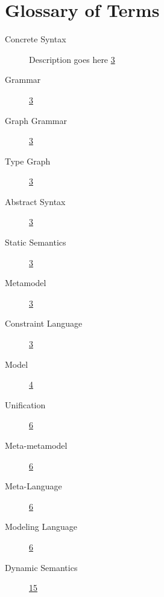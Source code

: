 \section{Glossary of Terms}

\begin{description}

\item[Concrete Syntax] Description goes here \hfill \hyperlink{page.3}{3}

\item[Grammar] \hfill \hyperlink{page.3}{3}

\item[Graph Grammar] \hfill \hyperlink{page.3}{3}

\item[Type Graph] \hfill \hyperlink{page.3}{3}

\item[Abstract Syntax] \hfill \hyperlink{page.3}{3}

\item[Static Semantics] \hfill \hyperlink{page.3}{3}

\item[Metamodel] \hfill \hyperlink{page.3}{3}

\item[Constraint Language] \hfill \hyperlink{page.3}{3}

\item[Model] \hfill \hyperlink{page.4}{4}

\item[Unification] \hfill \hyperlink{page.6}{6}

\item[Meta-metamodel] \hfill \hyperlink{page.6}{6}

\item[Meta-Language] \hfill \hyperlink{page.6}{6}

\item[Modeling Language] \hfill \hyperlink{page.6}{6}

\item[Dynamic Semantics] \hfill \hyperlink{page.15}{15}

\end{description}